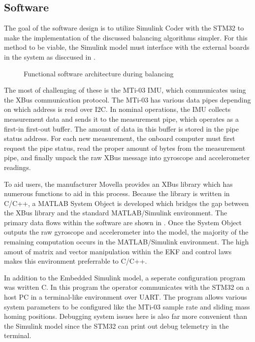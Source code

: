 \subsection{Software}\label{sec:software}

The goal of the software design is to utilize Simulink Coder with the STM32 to make the implementation of the discussed balancing algorithms simpler. For this method to be viable, the Simulink model must interface with the external boards in the system as disccused in . 

\begin{figure}
    \centering
    
    \caption{Functional software architecture during balancing}
    \label{fig:software_flowchart}
\end{figure}

The most of challenging of these is the MTi-03 IMU, which communicates using the XBus communication protocol. The MTi-03 has various data pipes depending on which address is read over I2C. In nominal operations, the IMU collects measurement data and sends it to the measurement pipe, which operates as a first-in first-out buffer. The amount of data in this buffer is stored in the pipe status address. For each new measurement, the onboard computer must first request the pipe status, read the proper amount of bytes from the measurement pipe, and finally unpack the raw XBus message into gyroscope and accelerometer readings. 

To aid users, the manufacturer Movella provides an XBus library which has numerous functions to aid in this process. Because the library is written in C/C++, a MATLAB System Object is developed which bridges the gap between the XBus library and the standard MATLAB/Simulink environment. The primary data flows within the software are shown in . Once the System Object outputs the raw gyroscope and accelerometer into the model, the majority of the remaining computation occurs in the MATLAB/Simulink environment. The high amout of matrix and vector manipulation within the EKF and control laws makes this environment preferrable to C/C++. 

In addition to the Embedded Simulink model, a seperate configuration program was written C. In this program the operator communicates with the STM32 on a host PC in a terminal-like environment over UART. The program allows various system parameters to be configured like the MTi-03 sample rate and sliding mass homing positions. Debugging system issues here is also far more convenient than the Simulink model since the STM32 can print out debug telemetry in the terminal.

